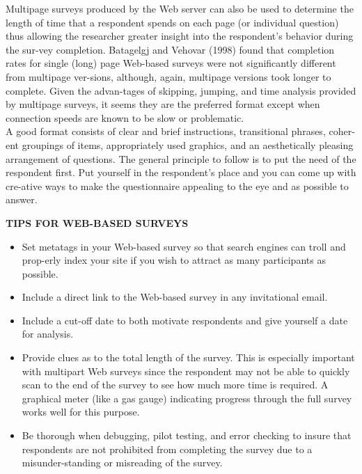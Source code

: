 \documentclass[8pt]{beamer}
\begin{document}
\begin{frame}
\hspace*{0.5cm} Multipage surveys produced by the Web server can also be used to determine the length of time that a respondent spends on each page (or individual question) thus allowing the researcher greater insight into the respondent's behavior during the sur-vey completion. Batagelgj and Vehovar (1998) found that completion rates for single (long) page Web-based surveys were not significantly different from multipage ver-sions, although, again, multipage versions took longer to complete. Given the advan-tages of skipping, jumping, and time analysis provided by multipage surveys, it seems they are the preferred format except when connection speeds are known to be slow or problematic.\\
\hspace*{0.5cm} A good format consists of clear and brief instructions, transitional phrases, coher-ent groupings of items, appropriately used graphics, and an aesthetically pleasing arrangement of questions. The general principle to follow is to put the need of the respondent first. Put yourself in the respondent's place and you can come up with cre-ative ways to make the questionnaire appealing to the eye and as possible to answer.\\

\vspace*{1cm}
\end{frame}

\begin{frame}
\large{
\textbf{TIPS FOR WEB-BASED SURVEYS}\\
}

\vspace*{0.3cm}
\small{
\begin{itemize}
  \item Set metatags in your Web-based survey so that search engines can troll and prop-erly index your site if you wish to attract as many participants as possible.\\
  \item Include a direct link to the Web-based survey in any invitational email.\\
  \item Include a cut-off date to both motivate respondents and give yourself a date for analysis.\\
  \item Provide clues as to the total length of the survey. This is especially important with multipart Web surveys since the respondent may not be able to quickly scan to the end of the survey to see how much more time is required. A graphical meter (like a gas gauge) indicating progress through the full survey works well for this purpose.\\
  \item Be thorough when debugging, pilot testing, and error checking to insure that respondents are not prohibited from completing the survey due to a misunder-standing or misreading of the survey.\\
\end{itemize}
}
\end{frame}
\end{document}
